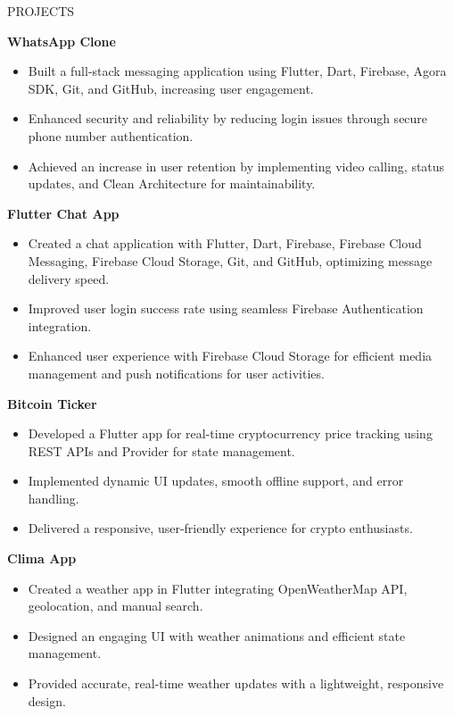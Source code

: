 \documentclass{resume} %
\begin{document}
\begin{rSection}{PROJECTS}
\vspace{0.8em}

\textbf{WhatsApp Clone} \hfill {}
\begin{itemize}
\item Built a full-stack messaging application using Flutter, Dart, Firebase, Agora SDK, Git, and GitHub, increasing user engagement.
\item Enhanced security and reliability by reducing login issues through secure phone number authentication.
\item Achieved an increase in user retention by implementing video calling, status updates, and Clean Architecture for maintainability.
\end{itemize}

\vspace{0.8em}

\textbf{Flutter Chat App} \hfill {}
\begin{itemize}
\item Created a chat application with Flutter, Dart, Firebase, Firebase Cloud Messaging, Firebase Cloud Storage, Git, and GitHub, optimizing message delivery speed.
\item Improved user login success rate using seamless Firebase Authentication integration.
\item Enhanced user experience with Firebase Cloud Storage for efficient media management and push notifications for user activities.
\end{itemize}

\vspace{0.8em}

\textbf{Bitcoin Ticker} \hfill {}
\begin{itemize}
\item Developed a Flutter app for real-time cryptocurrency price tracking using REST APIs and Provider for state management.
\item Implemented dynamic UI updates, smooth offline support, and error handling.
\item Delivered a responsive, user-friendly experience for crypto enthusiasts.
\end{itemize}

\vspace{0.8em}

\textbf{Clima App} \hfill {}
\begin{itemize}
\item Created a weather app in Flutter integrating OpenWeatherMap API, geolocation, and manual search.
\item Designed an engaging UI with weather animations and efficient state management.
\item Provided accurate, real-time weather updates with a lightweight, responsive design.
\end{itemize}



\end{rSection}
\end{document}
